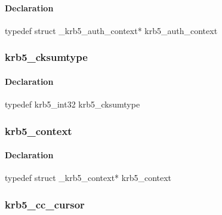 \documentclass[letterpaper,10pt,english]{sphinxmanual}
\begin{document}
\paragraph{Declaration}
\label{appdev/refs/types/krb5_auth_context:declaration}
typedef struct \_krb5\_auth\_context* krb5\_auth\_context


\subsubsection{krb5\_cksumtype}
\label{appdev/refs/types/krb5_cksumtype:krb5-cksumtype}\label{appdev/refs/types/krb5_cksumtype:krb5-cksumtype-struct}\label{appdev/refs/types/krb5_cksumtype::doc}

\begin{fulllineitems}
\label{appdev/refs/types/krb5_cksumtype:krb5_cksumtype}
\end{fulllineitems}



\paragraph{Declaration}
\label{appdev/refs/types/krb5_cksumtype:declaration}
typedef krb5\_int32 krb5\_cksumtype


\subsubsection{krb5\_context}
\label{appdev/refs/types/krb5_context:krb5-context}\label{appdev/refs/types/krb5_context:krb5-context-struct}\label{appdev/refs/types/krb5_context::doc}

\begin{fulllineitems}
\label{appdev/refs/types/krb5_context:krb5_context}
\end{fulllineitems}



\paragraph{Declaration}
\label{appdev/refs/types/krb5_context:declaration}
typedef struct \_krb5\_context* krb5\_context


\subsubsection{krb5\_cc\_cursor}
\label{appdev/refs/types/krb5_cc_cursor:krb5-cc-cursor-struct}\label{appdev/refs/types/krb5_cc_cursor:krb5-cc-cursor}\label{appdev/refs/types/krb5_cc_cursor::doc}
\end{document}
